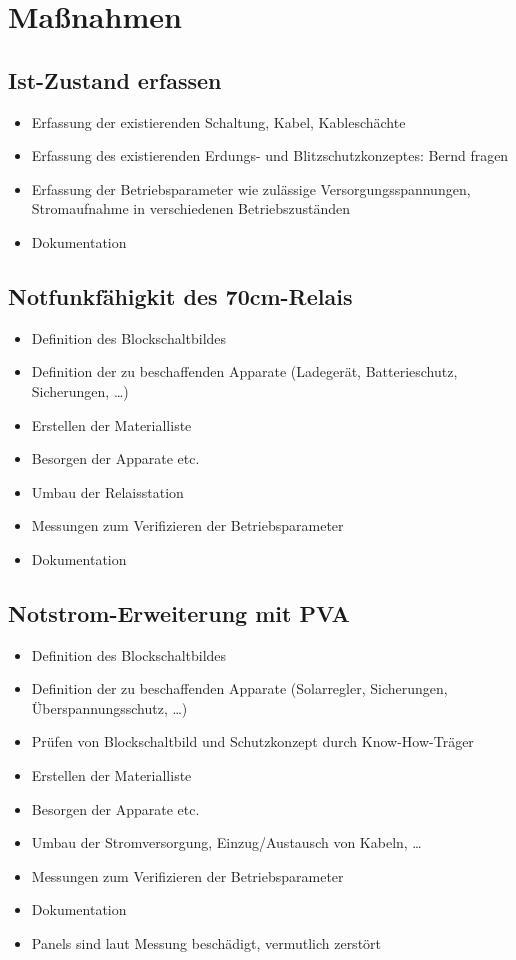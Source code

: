 \documentclass[a4paper]{scrartcl}
\begin{document}
\section{Ma\ss{}nahmen}
\subsection{Ist-Zustand erfassen}
\begin{itemize}
    \item Erfassung der existierenden Schaltung, Kabel, Kablesch\"achte
    \item Erfassung des existierenden Erdungs- und Blitzschutzkonzeptes: Bernd fragen
    \item Erfassung der Betriebsparameter wie zul\"assige Versorgungsspannungen, Stromaufnahme in verschiedenen Betriebszust\"anden
    \item Dokumentation
\end{itemize}

\subsection{Notfunkf\"ahigkit des 70cm-Relais}
\begin{itemize}
    \item Definition des Blockschaltbildes
    \item Definition der zu beschaffenden Apparate (Ladeger\"at, Batterieschutz, Sicherungen, \dots )
    \item Erstellen der Materialliste
    \item Besorgen der Apparate etc.
    \item Umbau der Relaisstation
    \item Messungen zum Verifizieren der Betriebsparameter
    \item Dokumentation
\end{itemize}

\subsection{Notstrom-Erweiterung mit PVA}
\begin{itemize}
    \item Definition des Blockschaltbildes
    \item Definition der zu beschaffenden Apparate (Solarregler, Sicherungen, \"Uberspannungsschutz, \dots)
    \item Pr\"ufen von Blockschaltbild und Schutzkonzept durch Know-How-Tr\"ager
    \item Erstellen der Materialliste
    \item Besorgen der Apparate etc.
    \item Umbau der Stromversorgung, Einzug/Austausch von Kabeln, \dots
    \item Messungen zum Verifizieren der Betriebsparameter
    \item Dokumentation
    \item Panels sind laut Messung besch\"adigt, vermutlich zerst\"ort
\end{itemize}
\end{document}
